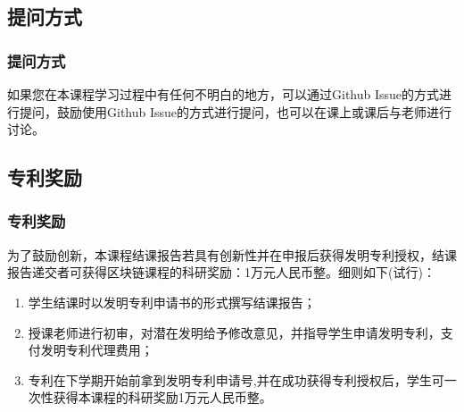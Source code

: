 \documentclass[11pt]{beamer}
\begin{document}
	\subsection{提问方式}
	\begin{frame}
	\frametitle{提问方式}
	如果您在本课程学习过程中有任何不明白的地方，可以通过Github Issue的方式进行提问，鼓励使用Github Issue的方式进行提问，也可以在课上或课后与老师进行讨论。
	\end{frame}

	\subsection{专利奖励}
	\begin{frame}
		\frametitle{专利奖励}
		为了鼓励创新，本课程结课报告若具有创新性并在申报后获得发明专利授权，结课报告递交者可获得区块链课程的科研奖励：1万元人民币整。细则如下(试行)：
		\begin{enumerate}
			\item 学生结课时以发明专利申请书的形式撰写结课报告；
			\item 授课老师进行初审，对潜在发明给予修改意见，并指导学生申请发明专利，支付发明专利代理费用；
			\item 专利在下学期开始前拿到发明专利申请号,并在成功获得专利授权后，学生可一次性获得本课程的科研奖励1万元人民币整。
		\end{enumerate}
	\end{frame}
\end{document}
